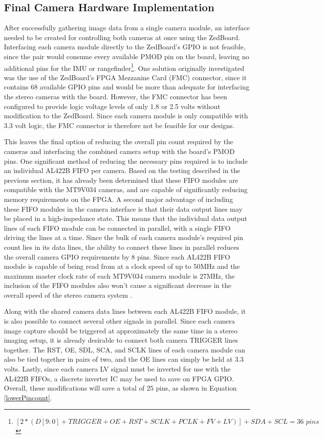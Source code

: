 \subsection{Final Camera Hardware Implementation}
After successfully gathering image data from a single camera module, an interface needed to be created for controlling both cameras at once using the ZedBoard. Interfacing each camera module directly to the ZedBoard's GPIO is not feasible, since the pair would consume every available PMOD pin on the board, leaving no additional pins for the IMU or rangefinder\footnote{$[2*(D[9:0]+TRIGGER+OE+RST+SCLK+PCLK+FV+LV)]+SDA+SCL = 36\,\,pins$}. One solution originally investigated was the use of the ZedBoard's FPGA Mezzanine Card (FMC) connector, since it contains 68 available GPIO pins and would be more than adequate for interfacing the stereo cameras with the board. However, the FMC connector has been configured to provide logic voltage levels of only 1.8 or 2.5 volts without modification to the ZedBoard. Since each camera module is only compatible with 3.3 volt logic, the FMC connector is therefore not be feasible for our designs.
\par
This leaves the final option of reducing the overall pin count required by the cameras and interfacing the combined camera setup with the board's PMOD pins. One significant method of reducing the necessary pins required is to include an individual AL422B FIFO per camera. Based on the testing described in the previous section, it has already been determined that these FIFO modules are compatible with the MT9V034 cameras, and are capable of significantly reducing memory requirements on the FPGA. A second major advantage of including these FIFO modules in the camera interface is that their data output lines may be placed in a high-impedance state. This means that the individual data output lines of each FIFO module can be connected in parallel, with a single FIFO driving the lines at a time. Since the bulk of each camera module's required pin count lies in its data lines, the ability to connect these lines in parallel reduces the overall camera GPIO requirements by 8 pins. Since each AL422B FIFO module is capable of being read from at a clock speed of up to 50MHz and the maximum master clock rate of each MT9V034 camera module is 27MHz, the inclusion of the FIFO modules also won't cause a significant decrease in the overall speed of the stereo camera system \cite{al422b,mt9v034}.
\par
Along with the shared camera data lines between each AL422B FIFO module, it is also possible to connect several other signals in parallel. Since each camera image capture should be triggered at approximately the same time in a stereo imaging setup, it is already desirable to connect both camera TRIGGER lines together. The RST, OE, SDL, SCA, and SCLK lines of each camera module can also be tied together in pairs of two, and the OE lines can simply be held at 3.3 volts. Lastly, since each camera LV signal must be inverted for use with the AL422B FIFOs, a discrete inverter IC may be used to save on FPGA GPIO. Overall, these modifications will save a total of 25 pins, as shown in Equation \ref{lowerPincount}.
